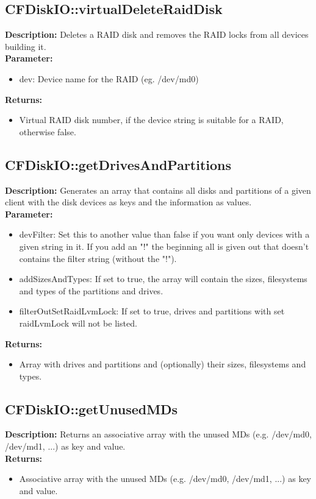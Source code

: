 \subsection{CFDiskIO::virtualDeleteRaidDisk}
\textbf{Description:} Deletes a RAID disk and removes the RAID locks from all devices building it.\\
\textbf{Parameter:}
\begin{itemize}
\item dev: Device name for the RAID (eg. /dev/md0)
\end{itemize}
\textbf{Returns:}
\begin{itemize}
\item Virtual RAID disk number, if the device string is suitable for a RAID, otherwise false.
\end{itemize}

\subsection{CFDiskIO::getDrivesAndPartitions}
\textbf{Description:} Generates an array that contains all disks and partitions of a given client with the disk devices as keys and the information as values.\\
\textbf{Parameter:}
\begin{itemize}
\item devFilter: Set this to another value than false if you want only devices with a given string in it. If you add an "!" the beginning all is given out that doesn't contains the filter string (without the "!").
\item addSizesAndTypes: If set to true, the array will contain the sizes, filesystems and types of the partitions and drives.
\item filterOutSetRaidLvmLock: If set to true, drives and partitions with set raidLvmLock will not be listed.
\end{itemize}
\textbf{Returns:}
\begin{itemize}
\item Array with drives and partitions and (optionally) their sizes, filesystems and types.
\end{itemize}

\subsection{CFDiskIO::getUnusedMDs}
\textbf{Description:} Returns an associative array with the unused MDs (e.g. /dev/md0, /dev/md1, ...) as key and value.\\
\textbf{Returns:}
\begin{itemize}
\item Associative array with the unused MDs (e.g. /dev/md0, /dev/md1, ...) as key and value.
\end{itemize}

